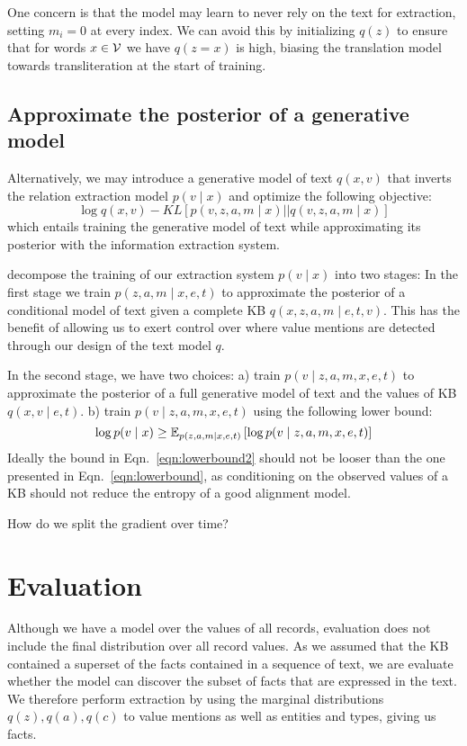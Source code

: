 \documentclass[12pt]{article}
\begin{document}
One concern is that the model may learn to never rely on the text for extraction,
setting $m_i = 0$ at every index.
We can avoid this by initializing $q(z)$ to ensure that for words $x \in \mathcal{V}$ 
we have $q(z = x)$ is high, biasing the translation model towards transliteration
at the start of training.

\subsection{Approximate the posterior of a generative model}
Alternatively, we may introduce a generative model of text $q(x, v)$ 
that inverts the relation extraction model $p(v \mid x)$ and optimize the following objective:
\begin{equation}
\log q(x,v) - KL[p(v,z,a,m \mid x) || q(v,z,a,m \mid x)]
\end{equation}
which entails training the generative model of text while approximating its
posterior with the information extraction system.

decompose the training of our extraction system $p(v\mid x)$ into two stages:
In the first stage we train $p(z,a,m\mid x,e,t)$ to approximate the posterior
of a conditional model of text given a complete KB $q(x,z,a,m \mid e,t,v)$.
This has the benefit of allowing us to exert control over where value mentions are detected
through our design of the text model $q$.

In the second stage, we have two choices:
a) train $p(v \mid z,a,m,x,e,t)$ to approximate the posterior of a full generative model of text and
the values of KB $q(x,v\mid e,t)$.
b) train $p(v \mid z,a,m,x,e,t)$ using the following lower bound:
\begin{equation}
\label{eqn:lowerbound2}
\log p(v\mid x) \geq
\mathbb{E}_{p(z,a,m\mid x,e,t)}\left[\log p(v\mid z,a,m, x,e,t)\right]
\end{equation}
Ideally the bound in Eqn.~\ref{eqn:lowerbound2}
should not be looser than the one presented in Eqn.~\ref{eqn:lowerbound},
as conditioning on the observed values of a KB should not reduce the entropy of
a good alignment model.

How do we split the gradient over time?

\section{Evaluation}
Although we have a model over the values of all records,
evaluation does not include the final distribution over all record values.
As we assumed that the KB contained a superset of the facts contained in
a sequence of text, we are evaluate whether the model can discover the subset of facts that 
are expressed in the text.
We therefore perform extraction by using the marginal distributions
$q(z),q(a),q(c)$ to value mentions as well as entities and types,
giving us facts.



\end{document}
